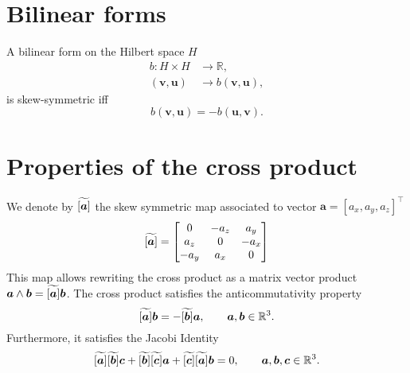 \begin{theorem}
\end{theorem}

\section{Bilinear forms}
	
\begin{definition}\label{def:sk_bilinear}
A bilinear form on the Hilbert space $H$
\begin{equation*}
\begin{aligned}
b: H \times H &\longrightarrow \mathbb{R}, \\
(\bm{v}, \bm{u}) &\longrightarrow b(\bm{v}, \bm{u}),
\end{aligned}
\end{equation*}
is skew-symmetric iff
\begin{equation*}
b(\bm{v}, \bm{u}) = - b(\bm{u}, \bm{v}).
\end{equation*}
\end{definition}

\section{Properties of the cross product}\label{sec:crossprod}
We denote by $\widetilde{\left[\bm{a}\right]}$ the skew symmetric map associated to vector $\bm{a} = [a_x, a_y, a_z]^\top$
\begin{equation}
\widetilde{\left[\bm{a}\right]} = 
\begin{bmatrix}
0 & -a_z & a_y \\
a_z & 0 & -a_x \\
-a_y & a_x & 0 \\
\end{bmatrix}
\end{equation}
This map allows rewriting the cross product as a matrix vector product $\bm{a}\wedge \bm{b} = \widetilde{\left[\bm{a}\right]}\bm{b}$. The cross product satisfies the anticommutativity property
\begin{equation}
\label{eq:anticom}
\widetilde{\left[\bm{a}\right]} \bm{b} = - \widetilde{\left[\bm{b}\right]} \bm{a}, \qquad \bm{a}, \bm{b} \in \mathbb{R}^3.
\end{equation}
Furthermore, it satisfies the Jacobi Identity
\begin{equation}
\label{eq:jacobi}
\widetilde{\left[\bm{a}\right]} \widetilde{\left[\bm{b}\right]} \bm{c} + \widetilde{\left[\bm{b}\right]} \widetilde{\left[\bm{c}\right]} \bm{a} + \widetilde{\left[\bm{c}\right]} \widetilde{\left[\bm{a}\right]} \bm{b} = 0, \qquad \bm{a}, \bm{b}, \bm{c} \in \mathbb{R}^3.
\end{equation}


